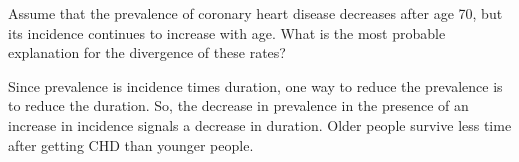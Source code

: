 
Assume that the prevalence of coronary heart disease decreases after
age 70, but its incidence continues to increase with age.  What is the
most probable explanation for the divergence of these rates?


\begin{AnswerText}
Since prevalence is incidence times duration, one way to reduce the
prevalence is to reduce the duration.  So, the decrease in prevalence
in the presence of an increase in incidence signals a decrease in
duration.  Older people survive less time after getting CHD than
younger people.
\end{AnswerText}